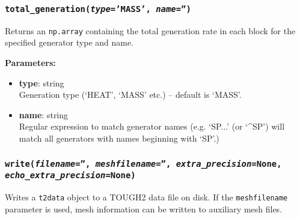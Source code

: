 \begin{snugshade}
\subsubsection{\texttt{total\_generation(\emph{type}='MASS', \emph{name}='')}}
\end{snugshade}
\label{sec:t2data:total_generation}

Returns an \texttt{np.array} containing the total generation rate in each block for the specified generator type and name.

\textbf{Parameters:}
\begin{itemize}
\item \textbf{type}: string\\
  Generation type (`HEAT', `MASS' etc.) -- default is `MASS'.
\item \textbf{name}: string\\
  Regular expression to match generator names (e.g. `SP...' (or `\^{}SP') will match all generators with names beginning with `SP'.)
\end{itemize}

\begin{snugshade}
\subsubsection{\texttt{write(\emph{filename}='', \emph{meshfilename}='', \emph{extra\_precision}=None,\\
    \emph{echo\_extra\_precision}=None)}}
\end{snugshade}
\label{sec:t2data:write}

Writes a \texttt{t2data} object to a TOUGH2 data file on disk.  If the \texttt{meshfilename} parameter is used, mesh information can be written to auxiliary mesh files.

